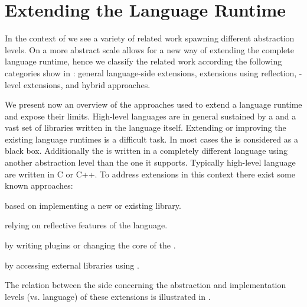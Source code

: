 \section{Extending the Language Runtime}
In the context of \B we see a variety of related work spawning different abstraction levels.
On a more abstract scale \B allows for a new way of extending the complete language runtime, hence we classify the related work according the following categories show in : general language-side extensions, extensions using reflection, \VM-level extensions, and hybrid approaches.

We present now an overview of the approaches used to extend a language runtime and expose their limits.
High-level languages are in general sustained by a \VM and a vast set of libraries written in the language itself. 
Extending or improving the existing language runtimes is a difficult task.
In most cases the \VM is considered as a black box.
Additionally the \VM is written in a completely different language using another abstraction level than the one it supports.
Typically high-level language \VMs are written in C or C++.
To address extensions in this context there exist some known approaches:

\begin{description}[noitemsep]
	\item[Language-side Library] based on implementing a new or existing library. 
	\item[Reflective Extension] relying on reflective features of the language. 
	\item[\VM Extension] by writing plugins or changing the core of the \VM.
	\item[Hybrid Extension] by accessing external libraries using \FFI.  
\end{description}
%
The relation between the side concerning the abstraction and implementation levels (\VM vs. language) of these extensions is illustrated in .

